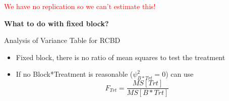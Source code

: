 \textcolor{red}{We have no replication so we can't estimate this!}

\newpage 

\textbf{What to do with fixed block?}\\
  \begin{center}Analysis of Variance Table for RCBD\end{center}    
    \begin{itemize}
   		\item{Fixed block, there is no ratio of mean squares to test the treatment}
			\item{If no Block*Treatment is reasonable ($\psi_{B*Trt}^{2}=0$) can use $$F_{Trt}=\frac{MS[Trt]}{MS[B*Trt]}$$ }    \\
		\end{itemize} 

